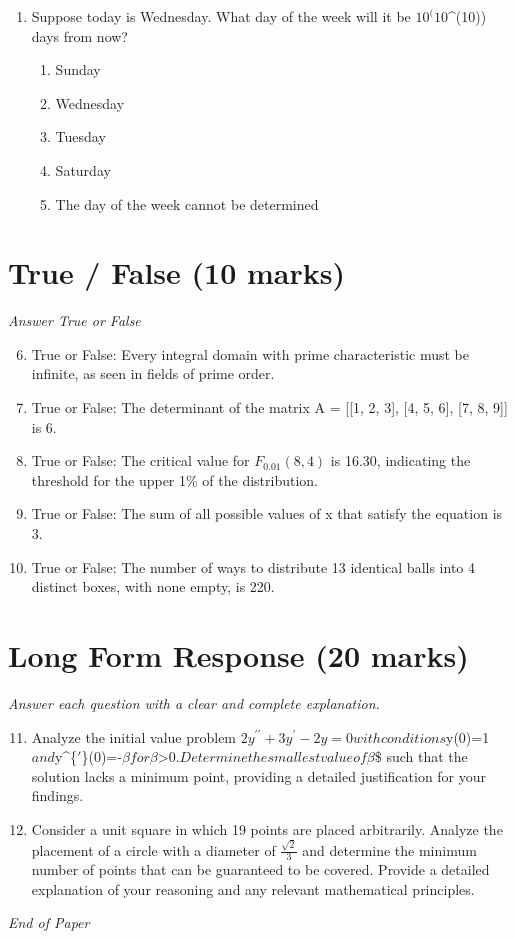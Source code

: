 \documentclass[12pt]{article}
\begin{document}
\begin{enumerate}[label=\arabic*.]
\begin{enumerate}[label=(\alph*)]
    \item E(X + Y) = 312, var(X + Y) = 14
\end{enumerate}
\item Suppose today is Wednesday. What day of the week will it be $10^(10$^(10)) days from now?
\begin{enumerate}[label=(\alph*)]
    \item Sunday
    \item Wednesday
    \item Tuesday
    \item Saturday
    \item The day of the week cannot be determined
\end{enumerate}
\end{enumerate}

\section*{True / False (10 marks)}
\textit{Answer True or False}
\begin{enumerate}[label=\arabic*.]
\setcounter{enumi}{5}
\item True or False: Every integral domain with prime characteristic must be infinite, as seen in fields of prime order.
\item True or False: The determinant of the matrix A = [[1, 2, 3], [4, 5, 6], [7, 8, 9]] is 6.
\item True or False: The critical value for $F_{0.01}(8,4)$ is 16.30, indicating the threshold for the upper 1\% of the distribution.
\item True or False: The sum of all possible values of x that satisfy the equation is 3.
\item True or False: The number of ways to distribute 13 identical balls into 4 distinct boxes, with none empty, is 220.
\end{enumerate}

\section*{Long Form Response (20 marks)}
\textit{Answer each question with a clear and complete explanation.}
\begin{enumerate}[label=\arabic*.]
\setcounter{enumi}{10}
\item Analyze the initial value problem $ 2 y^{\prime \prime}+3 y^{\prime}-2 y=0 $$ with conditions $y(0)=1$ and $y^\{\ensuremath{\prime}\}(0)=-\ensuremath{\beta}$ for $\ensuremath{\beta}\textgreater{}0$. Determine the smallest value of $\ensuremath{\beta}\$ such that the solution lacks a minimum point, providing a detailed justification for your findings.
\item Consider a unit square in which 19 points are placed arbitrarily. Analyze the placement of a circle with a diameter of $\frac{\sqrt{2}}{3}$ and determine the minimum number of points that can be guaranteed to be covered. Provide a detailed explanation of your reasoning and any relevant mathematical principles.
\end{enumerate}

\vfill
\noindent\textit{End of Paper}
\end{document}
